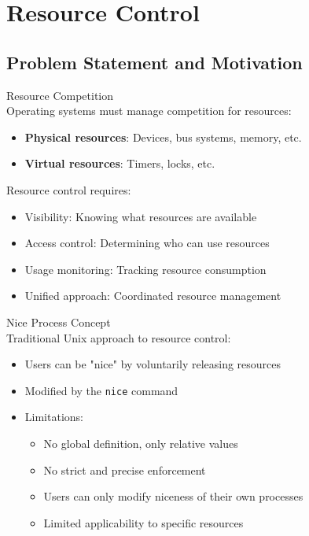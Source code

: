 \section{Resource Control}

\subsection{Problem Statement and Motivation}

\begin{concept}{Resource Competition}\\
    Operating systems must manage competition for resources:
    \begin{itemize}
        \item \textbf{Physical resources}: Devices, bus systems, memory, etc.
        \item \textbf{Virtual resources}: Timers, locks, etc.
    \end{itemize}
    
    Resource control requires:
    \begin{itemize}
        \item Visibility: Knowing what resources are available
        \item Access control: Determining who can use resources
        \item Usage monitoring: Tracking resource consumption
        \item Unified approach: Coordinated resource management
    \end{itemize}
\end{concept}

\begin{definition}{Nice Process Concept}\\
    Traditional Unix approach to resource control:
    \begin{itemize}
        \item Users can be "nice" by voluntarily releasing resources
        \item Modified by the \texttt{nice} command
        \item Limitations:
            \begin{itemize}
                \item No global definition, only relative values
                \item No strict and precise enforcement
                \item Users can only modify niceness of their own processes
                \item Limited applicability to specific resources
            \end{itemize}
    \end{itemize}
\end{definition}

